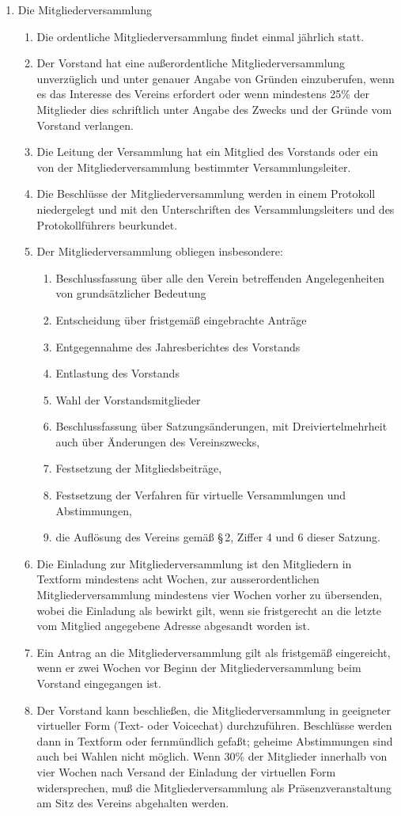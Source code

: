 \documentclass[12pt,a4paper]{article}
\begin{document}
\begin{enumerate}
\item Die Mitgliederversammlung
\begin{enumerate}
\item Die ordentliche Mitgliederversammlung findet einmal jährlich statt.
\item Der Vorstand hat eine außerordentliche Mitgliederversammlung unverzüglich und unter genauer Angabe von Gründen einzuberufen, wenn es das Interesse des Vereins erfordert oder wenn mindestens 25\% der Mitglieder dies schriftlich unter Angabe des Zwecks und der Gründe vom Vorstand verlangen.
\item Die Leitung der Versammlung hat ein Mitglied des Vorstands oder ein von der Mitgliederversammlung bestimmter Versammlungsleiter.
\item Die Beschlüsse der Mitgliederversammlung werden in einem Protokoll niedergelegt und mit den Unterschriften des Versammlungsleiters und des Protokollführers beurkundet.
\item Der Mitgliederversammlung obliegen insbesondere:
\begin{enumerate}
\item Beschlussfassung über alle den Verein betreffenden Angelegenheiten von grundsätzlicher Bedeutung
\item Entscheidung über fristgemäß eingebrachte Anträge
\item Entgegennahme des Jahresberichtes des Vorstands
\item Entlastung des Vorstands
\item Wahl der Vorstandsmitglieder
\item Beschlussfassung über Satzungsänderungen, mit Dreiviertelmehrheit auch über Änderungen des Vereinszwecks,
\item Festsetzung der Mitgliedsbeiträge,
\item Festsetzung der Verfahren für virtuelle Versammlungen und Abstimmungen, 
\item die Auflösung des Vereins gemäß §\,2, Ziffer 4 und 6 dieser Satzung.
\end{enumerate}
\item Die Einladung zur Mitgliederversammlung ist den Mitgliedern in Textform mindestens acht Wochen,‭ ‬zur ausserordentlichen Mitgliederversammlung mindestens vier Wochen vorher zu übersenden,‭ ‬wobei die Einladung als bewirkt gilt,‭ ‬wenn sie fristgerecht‭ ‬an die letzte vom Mitglied angegebene Adresse abgesandt worden ist.
\item Ein Antrag an die Mitgliederversammlung gilt als fristgemäß eingereicht, wenn er zwei Wochen vor Beginn der Mitgliederversammlung beim Vorstand eingegangen ist.
\item Der Vorstand kann beschließen, die Mitgliederversammlung in geeigneter virtueller Form (Text- oder Voicechat) durchzuführen. Beschlüsse werden dann in Textform oder fernmündlich gefaßt; geheime Abstimmungen sind auch bei Wahlen nicht möglich. Wenn 30\% der Mitglieder innerhalb von vier Wochen nach Versand der Einladung der virtuellen Form widersprechen, muß die Mitgliederversammlung als Präsenzveranstaltung am Sitz des Vereins abgehalten werden.
\end{enumerate}
\end{enumerate}
\end{document}
